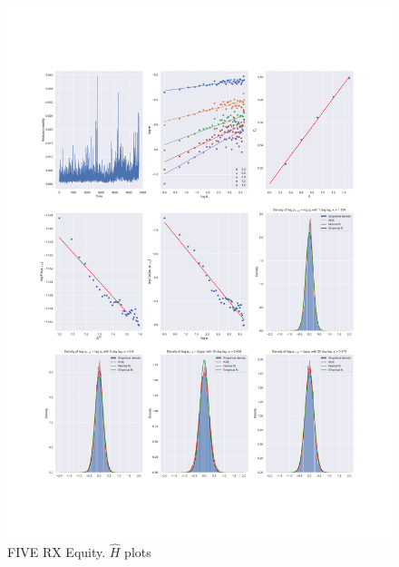 \begin{figure}[h]
    \centering
    \includegraphics[width=\linewidth]{fig/FIVE RX Equity.pdf}
    \caption{FIVE RX Equity. $\hat{H}$ plots}
\end{figure}